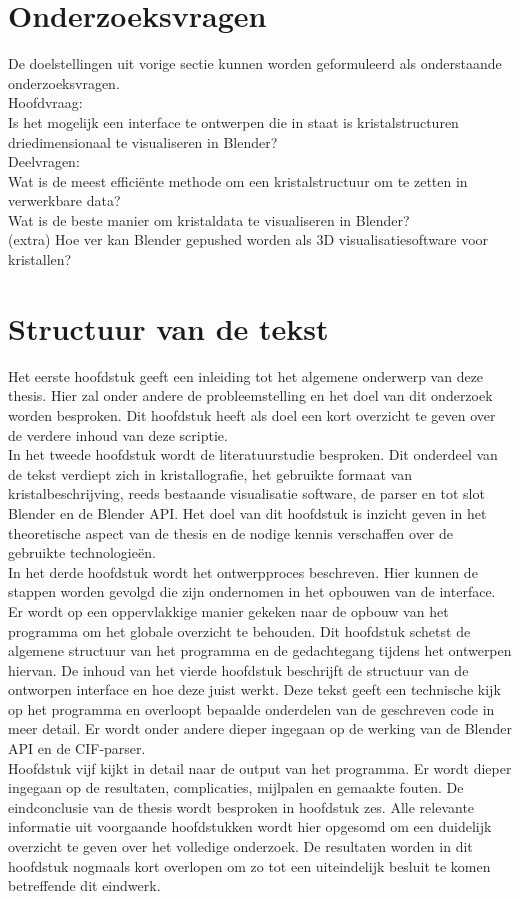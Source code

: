 \section{Onderzoeksvragen}
De doelstellingen uit vorige sectie kunnen worden geformuleerd als onderstaande onderzoeksvragen.
\\
Hoofdvraag:
\\
Is het mogelijk een interface te ontwerpen die in staat is kristalstructuren driedimensionaal te visualiseren in Blender?
\\
Deelvragen:
\\
Wat is de meest efficiënte methode om een kristalstructuur om te zetten in verwerkbare data?
\\
Wat is de beste manier om kristaldata te visualiseren in Blender?
\\
(extra) Hoe ver kan Blender gepushed worden als 3D visualisatiesoftware voor kristallen? 


\section{Structuur van de tekst}
Het eerste hoofdstuk geeft een inleiding tot het algemene onderwerp van deze thesis. Hier zal onder andere de probleemstelling en het doel van dit onderzoek worden besproken. Dit hoofdstuk heeft als doel een kort overzicht te geven over de verdere inhoud van deze scriptie.  
\\
In het tweede hoofdstuk wordt de literatuurstudie besproken. Dit onderdeel van de tekst verdiept zich in kristallografie, het gebruikte formaat van kristalbeschrijving, reeds bestaande visualisatie software, de parser en tot slot Blender en de Blender API. Het doel van dit hoofdstuk is inzicht geven in het theoretische aspect van de thesis en de nodige kennis verschaffen over de gebruikte technologieën.
\\
In het derde hoofdstuk wordt het ontwerpproces beschreven. Hier kunnen de stappen worden gevolgd die zijn ondernomen in het opbouwen van de interface. Er wordt op een oppervlakkige manier gekeken naar de opbouw van het programma om het globale overzicht te behouden. Dit hoofdstuk schetst de algemene structuur van het programma en de gedachtegang tijdens het ontwerpen hiervan.
De inhoud van het vierde hoofdstuk beschrijft de structuur van de ontworpen interface en hoe deze juist werkt. Deze tekst geeft een technische kijk op het programma en overloopt bepaalde onderdelen van de geschreven code in meer detail. Er wordt onder andere dieper ingegaan op de werking van de Blender API en de CIF-parser.
\\
Hoofdstuk vijf kijkt in detail naar de output van het programma. Er wordt dieper ingegaan op de resultaten, complicaties, mijlpalen en gemaakte fouten. 
De eindconclusie van de thesis wordt besproken in hoofdstuk zes. Alle relevante informatie uit voorgaande hoofdstukken wordt hier opgesomd om een duidelijk overzicht te geven over het volledige onderzoek. De resultaten worden in dit hoofdstuk nogmaals kort overlopen om zo tot een uiteindelijk besluit te komen betreffende dit eindwerk.
\\


